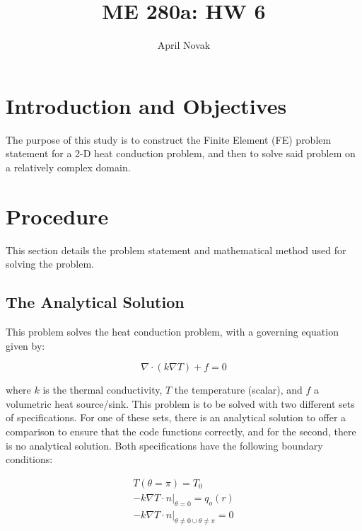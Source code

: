 \documentclass[10pt]{article}
\begin{document}
\title{ME 280a: HW 6}
\author{April Novak}

\maketitle

\section{Introduction and Objectives}

The purpose of this study is to construct the Finite Element (FE) problem statement for a 2-D heat conduction problem, and then to solve said problem on a relatively complex domain.

\section{Procedure}
\label{sec:Procedure}

This section details the problem statement and mathematical method used for solving the problem.

\subsection{The Analytical Solution}

This problem solves the heat conduction problem, with a governing equation given by:

\begin{equation}
\nabla\cdot(k\nabla T)+f=0
\end{equation}

where \(k\) is the thermal conductivity, \(T\) the temperature (scalar), and \(f\) a volumetric heat source/sink. This problem is to be solved with two different sets of specifications. For one of these sets, there is an analytical solution to offer a comparison to ensure that the code functions correctly, and for the second, there is no analytical solution. Both specifications have the following boundary conditions:

\begin{equation}
\begin{aligned}
T(\theta=\pi)=T_0\\
-k\nabla T\cdot\hat{n}|_{\theta=0}=q_o(r)\\
-k\nabla T\cdot\hat{n}|_{\theta\neq0\cup \theta\neq\pi}=0\\
\end{aligned}
\end{equation}
\end{document}
